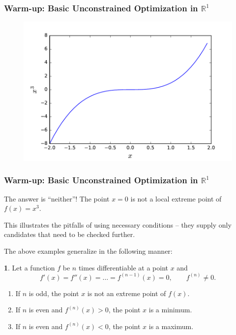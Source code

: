 \documentclass[10pt]{beamer}
\theoremstyle{definition}
\newtheorem{Fact}{\translate{Fact}}
\begin{document}
\begin{frame}[fragile]
\frametitle{Warm-up: Basic Unconstrained Optimization in $ \mathbb{R}^1 $}
\begin{figure}
\centering
\includegraphics[width=0.9\linewidth]{cubicfun}
\label{fig:cubicfun}
\end{figure}
\end{frame}

\begin{frame}[fragile]
\frametitle{Warm-up: Basic Unconstrained Optimization in $ \mathbb{R}^1 $}
\addtocounter{theorem}{-1}
\begin{example}[cont.]
The answer is ``neither''! The point $ x=0 $ is not a local extreme point of $ f(x)=x^3 $.\medskip

This illustrates the pitfalls of using necessary conditions -- they supply only candidates that need to be checked further.
\end{example}

The above examples generalize in the following manner:
\begin{Fact}
Let a function $ f $ be $ n $ times differentiable at a point $ x $ and 
\[ f'(x)=f''(x)=\ldots=f^{(n-1)}(x)=0,\qquad f^{(n)}\neq 0. \] \vskip -5pt
\begin{enumerate}
\item If $ n $ is odd, the point $ x $ is not an extreme point of $ f(x) $.
\item If $ n $ is even and $ f^{(n)}(x)>0 $, the point $ x $ is a minimum.
\item If $ n $ is even and $ f^{(n)}(x)<0 $, the point $ x $ is a maximum.
\end{enumerate}
\label{fc:SCsR1}
\end{Fact}
\end{frame}
\end{document}
